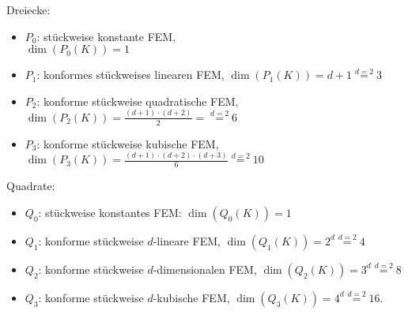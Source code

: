 \documentclass[12pt]{scrartcl}
\begin{document}
	\begin{minipage}{0.49\textwidth}
		Dreiecke:
		\begin{itemize}
			\item $P_0$: stückweise konstante FEM,\\ $\dim(P_0(K))=1$
			\item $P_1$: konformes stückweises linearen FEM, $\dim(P_1(K))=d+1\overset{d=2}{=}3$
			\item $P_2$: konforme stückweise quadratische FEM, $\dim(P_2(K))=\frac{(d+1)\cdot(d+2)}{2}=\overset{d=2}{=}6$
			\item $P_3$: konforme stückweise kubische FEM, $\dim(P_3(K))=\frac{(d+1)\cdot(d+2)\cdot(d+3)}{6}\overset{d=2}{=}10$
		\end{itemize}
	\end{minipage}
	\begin{minipage}{0.49\textwidth}
		Quadrate:
		\begin{itemize}
			\item $Q_0$: stückweise konstantes FEM: $\dim(Q_0(K))=1$
			\item $Q_1$: konforme stückweise $d$-lineare FEM, $\dim(Q_1(K))=2^d\overset{d=2}{=}4$
			\item $Q_2$: konforme stückweise $d$-dimensionalen FEM, $\dim(Q_2(K))=3^d\overset{d=2}{=}8$
			\item $Q_3$: konforme stückweise $d$-kubische FEM, $\dim(Q_3(K))=4^d\overset{d=2}{=}16$.
		\end{itemize}
	\end{minipage}
	
\end{document}

